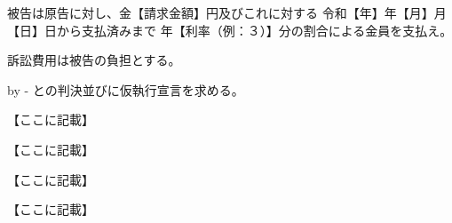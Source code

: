 \documentclass{ltjsarticle}
\begin{document}


\SecB{}

被告は原告に対し、金【請求金額】円及びこれに対する
令和【年】年【月】月【日】日から支払済みまで
年【利率（例：３）】分の割合による金員を支払え。

\SecB{}

訴訟費用は被告の負担とする。

{\advance\leftskip by -\parindent
との判決並びに仮執行宣言を求める。\par}

\vspace{1\zw}









\SecC{}

【ここに記載】

\SecC{}

【ここに記載】



\SecC{}

【ここに記載】

\SecC{}

【ここに記載】






\Ijo[2\zw]
\end{document}
